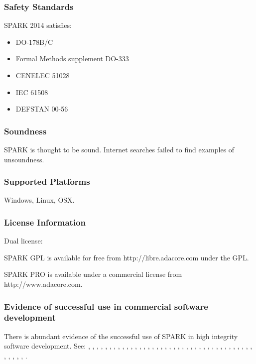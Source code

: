 \documentclass[12pt,openany,a4paper]{book}
\begin{document}
	\subsubsection{Safety Standards}
		SPARK 2014 satisfies:
	\begin{itemize}
		\item DO-178B/C
		\item Formal Methods supplement DO-333
		\item CENELEC 51028
		\item IEC 61508
		\item DEFSTAN 00-56
	\end{itemize}

	\subsubsection{Soundness}
		SPARK is thought to be sound. Internet searches failed to find examples of unsoundness.

	\subsubsection{Supported Platforms}
		Windows, Linux, OSX.

	\subsubsection{License Information}
		Dual license:

		SPARK GPL is available for free from http://libre.adacore.com under the GPL.

		SPARK PRO is available under a commercial license from http://www.adacore.com.


	\subsubsection{Evidence of successful use in commercial software development}
	There is abundant evidence of the successful use of SPARK in high integrity software development. See: \cite{spark01}, \cite{spark02}, \cite{spark03}, \cite{spark04}, \cite{spark05}, \cite{spark06}, \cite{spark07}, \cite{spark08}, \cite{spark09}, \cite{spark10}, \cite{spark11}, \cite{spark12}, \cite{spark13}, \cite{spark14}, \cite{spark15}, \cite{spark16}, \cite{spark17}, \cite{spark18}, \cite{spark19}, \cite{spark20}, \cite{spark21}, \cite{spark22}, \cite{spark23}, \cite{spark24}, \cite{spark25}, \cite{spark26}, \cite{spark27}, \cite{spark28}, \cite{spark29}, \cite{spark30}, \cite{spark31}, \cite{spark32}, \cite{spark33}, \cite{spark34}, \cite{spark35}, \cite{spark36}, \cite{spark37}, \cite{spark38}, \cite{spark39}, \cite{spark40}, \cite{spark41}, \cite{spark42}, \cite{spark43}, \cite{spark44}, \cite{spark45}.
	
\end{document}
